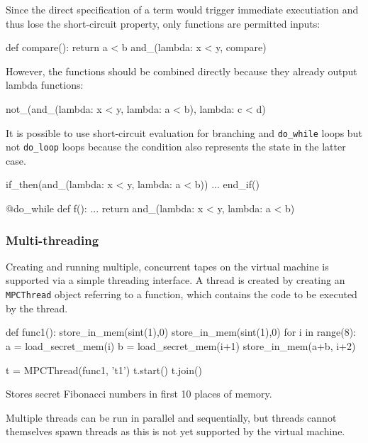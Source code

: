 \begin{mylisting}
Since the direct specification of a term would trigger immediate
executiation and thus lose the short-circuit property, only functions
are permitted inputs:

\begin{mylisting}
    def compare():
        return a < b
    and_(lambda: x < y, compare)
\end{mylisting}
However, the functions should be combined directly because they
already output lambda functions:

\begin{mylisting}
    not_(and_(lambda: x < y, lambda: a < b), lambda: c < d)
\end{mylisting}
It is possible to use short-circuit evaluation for branching and
\verb+do_while+ loops but not \verb+do_loop+ loops because the
condition also represents the state in the latter case.

\begin{mylisting}
if_then(and_(lambda: x < y, lambda: a < b))
...
end_if()

@do_while
def f():
    ...
    return and_(lambda: x < y, lambda: a < b)
\end{mylisting}

\subsubsection{Multi-threading}

Creating and running multiple, concurrent tapes on the virtual machine is
supported via a simple threading interface. A thread is created by creating
an \verb|MPCThread| object referring to a function, which contains the code
to be executed by the thread.

\begin{mylisting}
def func1():
    store_in_mem(sint(1),0)
    store_in_mem(sint(1),0)
    for i in range(8):
        a = load_secret_mem(i)
        b = load_secret_mem(i+1)
        store_in_mem(a+b, i+2)

t = MPCThread(func1, 't1')
t.start()
t.join()
\end{mylisting}
\begin{footnotesize}
Stores secret Fibonacci numbers in first 10 places of memory. \\
\end{footnotesize}
Multiple threads can be run in parallel and sequentially, but threads cannot
themselves spawn threads as this is not yet supported by the virtual machine.


\end{mylisting}
